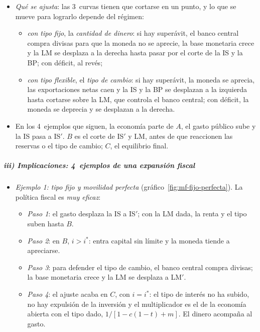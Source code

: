 \documentclass[11pt]{article}
\begin{document}
\begin{itemize}
\item \emph{Qué se ajusta}: las 3~curvas tienen que cortarse en un punto, y lo que se mueve para lograrlo depende del régimen:
  \begin{itemize}
  \item \emph{con tipo fijo}, la \emph{cantidad de dinero}: si hay superávit, el banco central compra divisas para que la moneda no se aprecie, la base monetaria crece y la LM se desplaza a la derecha hasta pasar por el corte de la IS y la BP; con déficit, al revés;
  \item \emph{con tipo flexible}, el \emph{tipo de cambio}: si hay superávit, la moneda se aprecia, las exportaciones netas caen y la IS y la BP se desplazan a la izquierda hasta cortarse sobre la LM, que controla el banco central; con déficit, la moneda se deprecia y se desplazan a la derecha.
  \end{itemize}
\item En los 4~ejemplos que siguen, la economía parte de $A$, el gasto público sube y la IS pasa a IS$'$. $B$ es el corte de IS$'$ y LM, antes de que reaccionen las reservas o el tipo de cambio; $C$, el equilibrio final.
\end{itemize}

\subparagraph{iii) Implicaciones: 4~ejemplos de una expansión fiscal}

\begin{itemize}
\item \emph{Ejemplo 1: tipo fijo y movilidad perfecta} (gráfico~\ref{fig:mf-fijo-perfecta}). La política fiscal es \emph{muy eficaz}:
  \begin{itemize}
  \item \emph{Paso 1}: el gasto desplaza la IS a IS$'$; con la LM dada, la renta y el tipo suben hasta $B$.
  \item \emph{Paso 2}: en $B$, $i>i^*$: entra capital sin límite y la moneda tiende a apreciarse.
  \item \emph{Paso 3}: para defender el tipo de cambio, el banco central compra divisas; la base monetaria crece y la LM se desplaza a LM$'$.
  \item \emph{Paso 4}: el ajuste acaba en $C$, con $i=i^*$: el tipo de interés no ha subido, no hay expulsión de la inversión y el multiplicador es el de la economía abierta con el tipo dado, $1/[1-c(1-t)+m]$. El dinero acompaña al gasto.
  \end{itemize}
\end{itemize}
\end{document}
